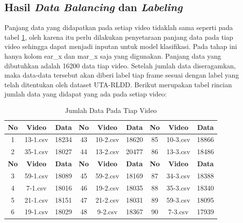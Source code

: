 \subsection{Hasil \emph{Data Balancing} dan \emph{Labeling}}
Panjang data yang didapatkan pada setiap video tidaklah sama seperti pada tabel \ref{tb:JumlahData}, oleh karena itu
perlu dilakukan penyetaraan panjang data pada tiap video sehingga dapat menjadi
inputan untuk model klasifikasi. Pada tahap ini hanya kolom ear\_x dan mar\_x
saja yang digunakan. Panjang data yang dibutuhkan adalah 16200 data tiap video.
Setelah jumlah data diseragamkan, maka data-data tersebut akan diberi label tiap
frame sesuai dengan label yang telah ditentukan oleh dataset UTA-RLDD. Berikut
merupakan tabel rincian jumlah data yang didapat yang ada pada setiap video:

\begin{longtable}{|c|c|c|c|c|c|c|c|c|}
  \caption{Jumlah Data Pada Tiap Video}
  \label{tb:JumlahData}                                                                                                                      \\
  \hline
  \rowcolor[HTML]{C0C0C0}
  \textbf{No} & \textbf{Video} & \textbf{Data} & \textbf{No} & \textbf{Video} & \textbf{Data} & \textbf{No} & \textbf{Video} & \textbf{Data} \\
  \hline
  1           & 13-1.csv       & 18234         & 43          & 10-2.csv       & 18620         & 85          & 10-3.csv       & 18866         \\
  2           & 35-1.csv       & 18027         & 44          & 13-2.csv       & 20477         & 86          & 13-3.csv       & 18486         \\
  \hline
  \rowcolor[HTML]{C0C0C0}
  \textbf{No} & \textbf{Video} & \textbf{Data} & \textbf{No} & \textbf{Video} & \textbf{Data} & \textbf{No} & \textbf{Video} & \textbf{Data} \\
  \hline
  3           & 59-1.csv       & 18089         & 45          & 59-2.csv       & 18169         & 87          & 34-3.csv       & 18388         \\
  4           & 7-1.csv        & 18016         & 46          & 19-2.csv       & 18035         & 88          & 35-3.csv       & 18340         \\
  5           & 21-1.csv       & 18151         & 47          & 21-2.csv       & 18031         & 89          & 59-3.csv       & 18095         \\
  6           & 19-1.csv       & 18029         & 48          & 9-2.csv        & 18367         & 90          & 7-3.csv        & 17939         \\

\end{longtable}
